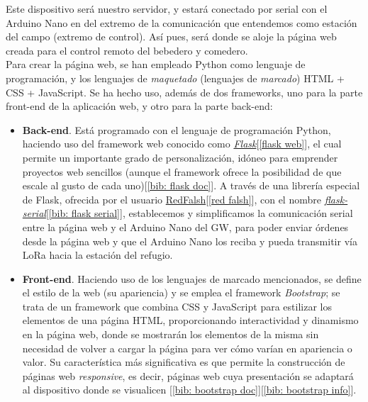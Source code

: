 \documentclass[12pt]{article}
\begin{document}
	\noindent Este dispositivo será nuestro servidor, y estará conectado por serial con el Arduino Nano en del extremo de la comunicación que entendemos como estación del campo (extremo de control). Así pues, será donde se aloje la página web creada para el control remoto del bebedero y comedero. \\
	
	\noindent Para crear la página web, se han empleado Python como lenguaje de programación, y los lenguajes de \textit{maquetado} (lenguajes de \textit{marcado}) HTML + CSS + JavaScript. Se ha hecho uso, además de dos frameworks, uno para la parte front-end de la aplicación web, y otro para la parte back-end:
	
	\begin{itemize}
		\item \textbf{Back-end}. Está programado con el lenguaje de programación Python, haciendo uso del framework web conocido como \href{https://flask.palletsprojects.com/en/2.0.x/}{\textit{Flask}}[\ref{flask web}], el cual permite un importante grado de personalización, idóneo para emprender proyectos web sencillos (aunque el framework ofrece la posibilidad de que escale al gusto de cada uno)[\ref{bib: flask doc}]. A través de una librería especial de Flask, ofrecida por el usuario \href{https://github.com/RedFalsh}{RedFalsh}[\ref{red falsh}], con el nombre \href{https://github.com/RedFalsh/flask-serial/blob/master/README.md}{\textit{flask-serial}}[\ref{bib: flask serial}], establecemos y simplificamos la comunicación serial entre la página web y el Arduino Nano del GW, para poder enviar órdenes desde la página web y que el Arduino Nano los reciba y pueda transmitir vía LoRa hacia la estación del refugio. 
		\item \textbf{Front-end}. Haciendo uso de los lenguajes de marcado mencionados, se define el estilo de la web (su apariencia) y se emplea el framework \textit{Bootstrap}; se trata de un framework que combina CSS y JavaScript  para estilizar los elementos  de una página HTML, proporcionando interactividad  y dinamismo en la página web, donde se mostrarán los elementos de la misma sin necesidad de volver a cargar la página para ver cómo varían en apariencia o valor. Su característica más significativa es que permite la construcción de páginas web \textit{responsive}, es decir, páginas web cuya presentación se adaptará al dispositivo donde se visualicen [\ref{bib: bootstrap doc}][\ref{bib: bootstrap info}].
	\end{itemize} 
	
\end{document}
